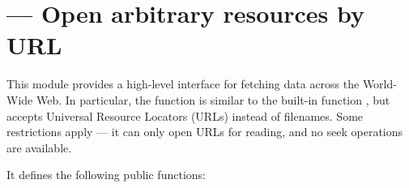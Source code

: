 \section{ ---
         Open arbitrary resources by URL}




This module provides a high-level interface for fetching data across
the World-Wide Web.  In particular, the  function
is similar to the built-in function , but accepts
Universal Resource Locators (URLs) instead of filenames.  Some
restrictions apply --- it can only open URLs for reading, and no seek
operations are available.

It defines the following public functions:

